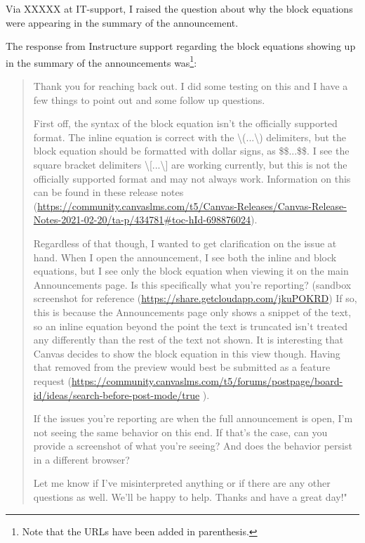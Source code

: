 Via XXXXX at IT-support, I raised the question about why the block equations were appearing in the summary of the announcement.

The response from Instructure support regarding the block equations showing up in the summary of the announcements was\footnote{Note that the URLs have been added in parenthesis.}:
\begin{quote}
Thank you for reaching back out.  I did some testing on this and I have a few things to point out and some follow up questions.

First off, the syntax of the block equation isn't the officially supported format.  The inline equation is correct with the \textbackslash(...\textbackslash) delimiters, but the block equation should be formatted with dollar signs, as \$\$...\$\$.  I see the square bracket delimiters \textbackslash[...\textbackslash] are working currently, but this is not the officially supported format and may not always work.  Information on this can be found in these release notes (\url{https://community.canvaslms.com/t5/Canvas-Releases/Canvas-Release-Notes-2021-02-20/ta-p/434781\#toc-hId-698876024}).

Regardless of that though, I wanted to get clarification on the issue at hand.  When I open the announcement, I see both the inline and block equations, but I see only the block equation when viewing it on the main Announcements page.  Is this specifically what you're reporting?  (sandbox screenshot for reference (\url{https://share.getcloudapp.com/jkuPOKRD})  If so, this is because the Announcements page only shows a snippet of the text, so an inline equation beyond the point the text is truncated isn't treated any differently than the rest of the text not shown.  It is interesting that Canvas decides to show the block equation in this view though.  Having that removed from the preview would best be submitted as a feature request (\url{https://community.canvaslms.com/t5/forums/postpage/board-id/ideas/search-before-post-mode/true} ).

If the issues you're reporting are when the full announcement is open, I'm not seeing the same behavior on this end.  If that's the case, can you provide a screenshot of what you're seeing?  And does the behavior persist in a different browser?

Let me know if I've misinterpreted anything or if there are any other questions as well.  We'll be happy to help.  Thanks and have a great day!"
\end{quote}

